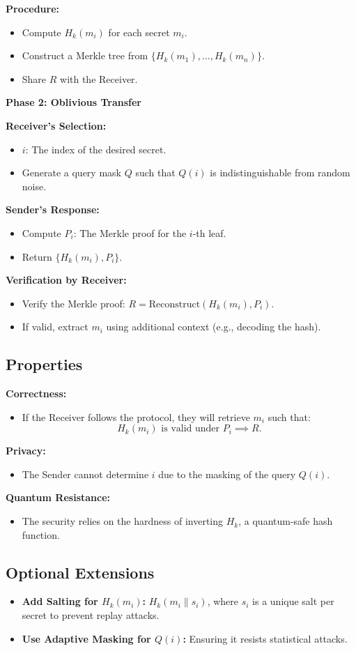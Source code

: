 \textbf{Procedure:}
\begin{itemize}
    \item Compute $H_k(m_i)$ for each secret $m_i$.
    \item Construct a Merkle tree from $\{ H_k(m_1), \dots, H_k(m_n) \}$.
    \item Share $R$ with the Receiver.
\end{itemize}

\textbf{Phase 2: Oblivious Transfer}

\textbf{Receiver’s Selection:}
\begin{itemize}
    \item $i$: The index of the desired secret.
    \item Generate a query mask $Q$ such that $Q(i)$ is indistinguishable from random noise.
\end{itemize}

\textbf{Sender’s Response:}
\begin{itemize}
    \item Compute $P_i$: The Merkle proof for the $i$-th leaf.
    \item Return $\{ H_k(m_i), P_i \}$.
\end{itemize}

\textbf{Verification by Receiver:}
\begin{itemize}
    \item Verify the Merkle proof: $R = \text{Reconstruct}(H_k(m_i), P_i)$.
    \item If valid, extract $m_i$ using additional context (e.g., decoding the hash).
\end{itemize}

\subsection{Properties}
\textbf{Correctness:}
\begin{itemize}
    \item If the Receiver follows the protocol, they will retrieve $m_i$ such that:
    \[
        H_k(m_i) \text{ is valid under } P_i \implies R.
    \]
\end{itemize}

\textbf{Privacy:}
\begin{itemize}
    \item The Sender cannot determine $i$ due to the masking of the query $Q(i)$.
\end{itemize}

\textbf{Quantum Resistance:}
\begin{itemize}
    \item The security relies on the hardness of inverting $H_k$, a quantum-safe hash function.
\end{itemize}

\subsection{Optional Extensions}
\begin{itemize}
    \item \textbf{Add Salting for $H_k(m_i)$:} $H_k(m_i \parallel s_i)$, where $s_i$ is a unique salt per secret to prevent replay attacks.
    \item \textbf{Use Adaptive Masking for $Q(i)$:} Ensuring it resists statistical attacks.
\end{itemize}
